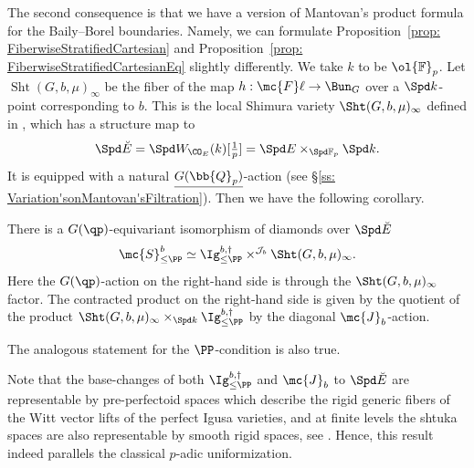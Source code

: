 \documentclass[letterpaper,11pt]{amsart}
\begin{document}
The second consequence is that we have a version of Mantovan's product formula for the Baily--Borel boundaries. Namely, we can formulate Proposition~\ref{prop: FiberwiseStratifiedCartesian} and Proposition~\ref{prop: FiberwiseStratifiedCartesianEq} slightly differently. We take $k$ to be $\ol{\mathbb{F}}_p$. Let $\operatorname{Sht}(G,b,\mu)_{\infty}$ be the fiber of the map $h: \mc{F}\ell\to \Bun_G$ over a $\Spd k$-point corresponding to $b$. This is the local Shimura variety $\Sht(G,b,\mu)_{\infty}$ defined in \cite[Section 23]{SW}, which has a structure map to 
\[\Spd \Breve{E}=\Spd W_{\CO_E}(k)[\tfrac{1}{p}]= \Spd E\times_{\Spd \mathbb{F}_p}\Spd k.\] It is equipped with a natural $\underline{G(\bb{Q}_{p})}$-action (see \S \ref{ss: Variation'sonMantovan'sFiltration}). Then we have the following corollary.  
\begin{corollary}\label{cor: GeoMantovanBoundary}
    There is a $G(\qp)$-equivariant isomorphism of diamonds over $\Spd \Breve{E}$
    \[\mc{S}^b_{\leq \PP} \simeq \Ig^{b,\dagger}_{\leq \PP} \times^{\mathcal{J}_{b}} \Sht(G,b,\mu)_{\infty}.\]
    Here the $G(\qp)$-action on the right-hand side is through the $\Sht(G,b,\mu)_{\infty}$ factor. The contracted product on the right-hand side is given by the quotient of the product $\Sht(G,b,\mu)_{\infty} \times_{\Spd k} \Ig^{b,\dagger}_{\leq \PP}$ by the diagonal $\mc{J}_b$-action. 

    The analogous statement for the $\PP$-condition is also true. 
\end{corollary}
\begin{remark}
    Note that the base-changes of both $\Ig^{b,\dagger}_{\leq \PP}$ and $\mc{J}_b$ to $\Spd \Breve{E}$ are representable by pre-perfectoid spaces which describe the rigid generic fibers of the Witt vector lifts of the perfect Igusa varieties, and at finite levels the shtuka spaces are also representable by smooth rigid spaces, see \cite[Lecture 24.1, 24.2]{SW}. Hence, this result indeed parallels the classical $p$-adic uniformization.
\end{remark}
\end{document}
